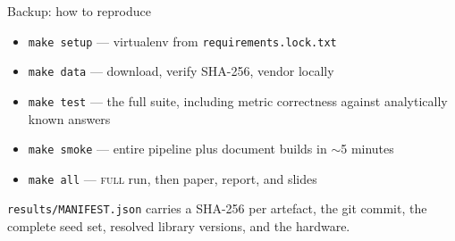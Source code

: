 \begin{frame}{Backup: how to reproduce}
\small
\begin{itemize}\setlength\itemsep{0.4em}
  \item \texttt{make setup} --- virtualenv from \texttt{requirements.lock.txt}
  \item \texttt{make data} --- download, verify SHA-256, vendor locally
  \item \texttt{make test} --- the full suite, including metric correctness against
    analytically known answers
  \item \texttt{make smoke} --- entire pipeline plus document builds in $\sim$5 minutes
  \item \texttt{make all} --- \textsc{full} run, then paper, report, and slides
\end{itemize}
\medskip
\texttt{results/MANIFEST.json} carries a SHA-256 per artefact, the git commit, the
complete seed set, resolved library versions, and the hardware.
\end{frame}
